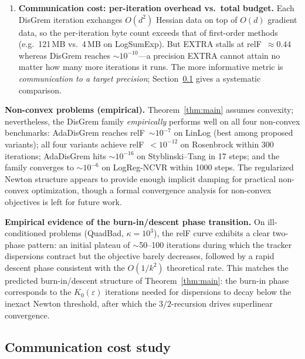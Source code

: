 \documentclass[11pt,a4paper]{article}
\def\cO{O}%
\newcommand{\cO}{\mathcal{O}}
\begin{document}
\begin{enumerate}[leftmargin=1.4em,itemsep=2pt]
		\item \textbf{Communication cost: per-iteration overhead vs.\
			total budget.}
		Each DisGrem iteration exchanges $\cO(d^2)$ Hessian data on
		top of $\cO(d)$ gradient data, so the per-iteration byte count
		exceeds that of first-order methods
		(e.g.\ 121\,MB vs.\ 4\,MB on LogSumExp).
		But EXTRA stalls at relF~$\approx0.44$ whereas DisGrem reaches
		$\sim10^{-10}$---a precision EXTRA cannot attain no matter how
		many more iterations it runs.
		The more informative metric is \emph{communication to a
		target precision}; Section~\ref{ssec:commexp} gives a
		systematic comparison.
	\end{enumerate}
	
	\noindent\textbf{Non-convex problems (empirical).}
	Theorem~\ref{thm:main} assumes convexity; nevertheless, the
	DisGrem family \emph{empirically} performs well on all four
	non-convex benchmarks:
	AdaDisGrem reaches relF~$\sim10^{-7}$ on LinLog (best among
	proposed variants); all four variants achieve relF~$<10^{-12}$
	on Rosenbrock within 300 iterations; AdaDisGrem hits $\sim10^{-16}$
	on Styblinski--Tang in 17 steps; and the family converges to
	$\sim10^{-6}$ on LogReg-NCVR within 1000 steps.
	The regularized Newton structure appears to provide enough
	implicit damping for practical non-convex optimization, though
	a formal convergence analysis for non-convex objectives is
	left for future work.
	
	\noindent\textbf{Empirical evidence of the burn-in/descent phase transition.}
	On ill-conditioned problems (QuadBad, $\kappa{=}10^3$), the relF
	curve exhibits a clear two-phase pattern: an initial plateau of
	$\sim$50--100 iterations during which the tracker dispersions
	contract but the objective barely decreases, followed by a rapid
	descent phase consistent with the $\cO(1/k^2)$ theoretical rate.
	This matches the predicted burn-in/descent structure of
	Theorem~\ref{thm:main}: the burn-in phase corresponds to the
	$K_0(\varepsilon)$ iterations needed for dispersions to decay below
	the inexact Newton threshold, after which the $3/2$-recursion
	drives superlinear convergence.
	
	\subsection{Communication cost study}\label{ssec:commexp}
	
\end{document}

